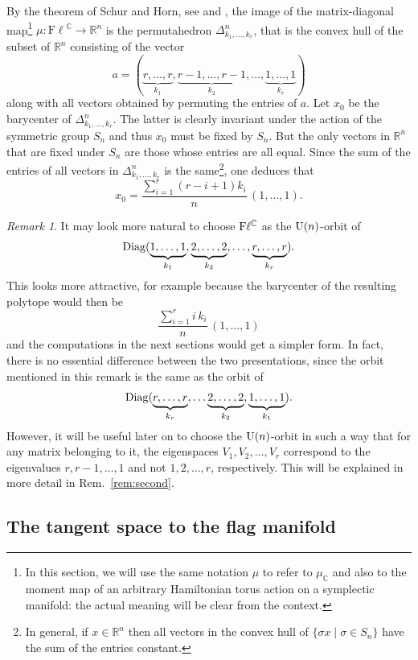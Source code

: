\documentclass[12pt]{amsart}
\theoremstyle{definition}
\theoremstyle{remark}
\newtheorem{rem}[thm]{Remark}
\newcommand{\RR}{\mathbb R}
\newcommand{\CC}{\mathbb C}
\newcommand{\Fl}{{\mathrm{F\ell}}}
\begin{document}
By the theorem of Schur and Horn, see \cite{Schur} and \cite{Ho}, the image of the matrix-diagonal map\footnote{In this section, we will use the same notation $\mu$ to refer to $\mu_\CC$ and also to the moment map of an arbitrary Hamiltonian torus action on a symplectic manifold: the actual meaning will be clear from the context.} $\mu: \Fl^\CC \to \RR^n$ is the permutahedron $\Delta_{k_1, \ldots, k_r}^n$, that is the convex hull of the subset of $\RR^n$  consisting of the vector   
$$a=(\underbrace{r, \dots, r}_{k_1},
\underbrace{r-1, \dots, r-1}_{k_2},
\dots,
\underbrace{1, \dots, 1}_{k_r})$$
along with all vectors obtained by permuting the entries of $a$.  
Let $x_0$ be  the barycenter of $\Delta_{k_1, \ldots, k_r}^n$. The latter is clearly invariant under the action of the symmetric group $S_n$ and thus $x_0$ must be fixed by $S_n$. But the only vectors in $\RR^n$ that are fixed under $S_n$ are those whose entries are all equal. Since the sum of the entries of all vectors in $\Delta_{k_1, \ldots, k_r}^n$ is the same\footnote{In general, if $x\in \RR^n$ then all vectors in the convex hull of $\{\sigma x \mid \sigma\in S_n\}$ have the sum of the entries constant.}, one deduces that
\begin{equation}\label{eq:xzero}x_0= \frac{\sum_{i=1}^r (r-i+1)k_i}{n}\,(1,\dots,1).
\end{equation}

\begin{rem} \label{rem:first}
It may look more natural to choose ${\rm F}\ell^\CC$ as the ${\rm U}(n)$-orbit of 
$${\rm Diag} (\underbrace{1, \dots, 1}_{k_1},
\underbrace{2, \dots, 2}_{k_2},
\dots,
\underbrace{r, \dots, r}_{k_r}).$$
This  looks more attractive, for example because the barycenter of the resulting polytope would then be
$$\frac{\sum_{i=1}^r i\, k_i}{n}\,(1,\dots,1)$$
and the computations in the next sections would get a simpler form.
In fact, there is no essential difference between the two presentations, since the orbit mentioned in this remark is the same as the orbit of 
$${\rm Diag} (\underbrace{r, \dots, r}_{k_r}, \dots
\underbrace{2, \dots, 2}_{k_{2}},
\underbrace{1, \dots, 1}_{k_1}).$$
However, it will be useful later on to choose  the ${\rm U}(n)$-orbit in such a way that for any matrix belonging to it, the eigenspaces $V_1, V_2, \ldots, V_r$ correspond to the eigenvalues $r, r-1, \ldots, 1$ and not $1, 2, \ldots, r$, respectively. This will be explained in more detail in Rem.~\ref{rem:second}.
\end{rem}


\subsection{The tangent space to the flag manifold}
\end{document}
